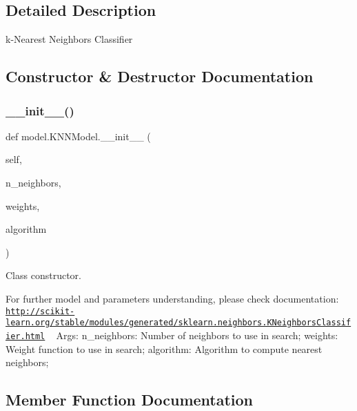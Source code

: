 \subsection{Detailed Description}
k-\/\+Nearest Neighbors Classifier 

\subsection{Constructor \& Destructor Documentation}
\mbox{\label{classmodel_1_1_k_n_n_model_adf9dfe4873a42c286cf74ce993eb9cc5}} 
\subsubsection{\texorpdfstring{\+\_\+\+\_\+init\+\_\+\+\_\+()}{\_\_init\_\_()}}
{\footnotesize\ttfamily def model.\+K\+N\+N\+Model.\+\_\+\+\_\+init\+\_\+\+\_\+ (\begin{DoxyParamCaption}\item[{}]{self,  }\item[{}]{n\+\_\+neighbors,  }\item[{}]{weights,  }\item[{}]{algorithm }\end{DoxyParamCaption})}



Class constructor. 

For further model and parameters understanding, please check documentation\+: \href{http://scikit-learn.org/stable/modules/generated/sklearn.neighbors.KNeighborsClassifier.html}{\tt http\+://scikit-\/learn.\+org/stable/modules/generated/sklearn.\+neighbors.\+K\+Neighbors\+Classifier.\+html} ~\newline
 Args\+: n\+\_\+neighbors\+: Number of neighbors to use in search; weights\+: Weight function to use in search; algorithm\+: Algorithm to compute nearest neighbors; 

\subsection{Member Function Documentation}
\mbox{\label{classmodel_1_1_k_n_n_model_aa81d72d9267f8a9cac3e2ec969fdf2a2}} 
